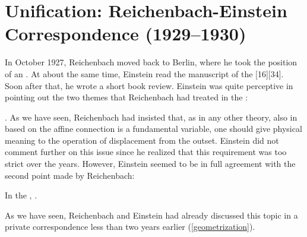 \documentclass[final]{article}
\renewcommand{\me}{;~m.e.{}}
\newcommand{\PRZL}{\citetitle{Reichenbach1928}\xspace}
\begin{document}
\section{Unification: Reichenbach-Einstein Correspondence (1929--1930)}
\label{unification}
%
In October 1927, Reichenbach moved back to Berlin, where he took the position of an  \citep{Hecht1982}. At about the same time, Einstein read the manuscript of the \PRZL {}[16][34]. Soon after that, he wrote a short book review. Einstein was quite perceptive in pointing out the two themes that Reichenbach had treated in the \Ap: \begin{inparaenum}[(1)] \item {} \citep[20\me]{Einstein1928d}. As we have seen, Reichenbach had insisted that, as in any other theory, also in \uft based on the affine connection is a fundamental variable, one should give physical meaning to the operation of displacement from the outset. Einstein did not comment further on this issue since he realized that this requirement was too strict over the years. However, Einstein seemed to be in full agreement with the second point made by Reichenbach: \item In the \Ap,  \citep[20\me]{Einstein1928d}. \end{inparaenum} As we have seen, Reichenbach and Einstein had already discussed this topic in a private correspondence less than two years earlier (\cref{geometrization}). 
\end{document}
